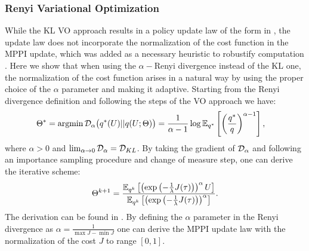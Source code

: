 \documentclass[twoside,11pt]{article}
\begin{document}
\subsubsection{Renyi Variational Optimization}
\label{sec: renyi_vo}
While the KL \ac{VO} approach results in a policy update law of the form in , the update law does not incorporate the normalization of the cost function in the \ac{MPPI} update, which was added as a necessary heuristic to robustify computation \citep{theodorou2010generalized, williams2018information}. Here we show that when using the $\alpha-$Renyi divergence \citep{renyi1961measures} instead of the KL one, the normalization of the cost function arises in a natural way by using the proper choice of the $\alpha$ parameter and making it adaptive. Starting from the Renyi divergence definition and following the steps of the \ac{VO} approach we have: 
\begin{align}
    \Theta^{*} &= \argmin {\cal{D}}_{\alpha}\big(q^{*}(U) || q(U;\Theta) \big) = \frac{1}{\alpha-1}\log\Eb_{q^*}\left[\left(\frac{q^*}{q}\right)^{\alpha-1}\right],
    \label{eq:Renyi}
\end{align}
where $ \alpha > 0  $ and $ \lim_{\alpha \to 0}{\cal{D}}_{\alpha}   =  {\cal{D}}_{KL}$. By taking the gradient of $ {\cal{D}}_{\alpha} $ and following an importance sampling procedure and change of measure step, one can derive the iterative scheme:
\begin{equation}
    \Theta^{k+1}  =  \frac{\mathbb{E}_{q^k}\left[ \left( \exp\left(-\frac{1}{\lambda} J(\tau)\right) \right)^{\alpha} U \right]}{\mathbb{E}_{q^k}\left[\left( \exp\left(-\frac{1}{\lambda} J(\tau)\right) \right)^{\alpha} \right]}.
\end{equation}
The derivation can be found in . By defining the $ \alpha $ parameter in the Renyi divergence as $ \alpha = \frac{1}{\max J - \min J}$ one can derive the MPPI update law with the normalization of the cost $ J $ to  range $[0,1]$.
\end{document}
